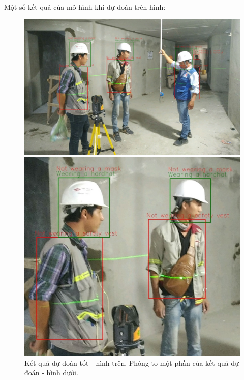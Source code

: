 Một số kết quả của mô hình khi dự đoán trên hình:
\begin{figure}[ht!]
	\centerline{\includegraphics[scale=0.2]{images/result_2.jpg}}
	\centerline{\includegraphics[scale=0.37]{images/result_2a.jpg}}
  	\caption{Kết quả dự đoán tốt - hình trên. Phóng to một phần của kết quả dự đoán - hình dưới.}
  	\label{fig:precision_recall_map}
\end{figure}
